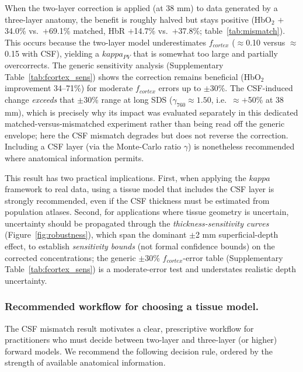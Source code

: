 \documentclass[11pt]{article}
\def\kappa{kappa}%
\def\mathrm#1{#1}%
\def\,{ }%
\begin{document}
When the two-layer correction is applied (at 38\,mm) to data generated by a three-layer anatomy, the benefit is roughly halved but stays positive (HbO$_2$ $+$34.0\% vs.\ $+$69.1\% matched, HbR $+$14.7\% vs.\ $+$37.8\%; table~\ref{tab:mismatch}). This occurs because the two-layer model underestimates $f_{\mathrm{cortex}}$ ($\approx$0.10 versus $\approx$0.15 with CSF), yielding a $\kappa_{\mathrm{PV}}$ that is somewhat too large and partially overcorrects. The generic sensitivity analysis (Supplementary Table~\ref{tab:fcortex_sens}) shows the correction remains beneficial (HbO$_2$ improvement 34--71\%) for moderate $f_{\mathrm{cortex}}$ errors up to $\pm$30\%. The CSF-induced change \emph{exceeds} that $\pm$30\% range at long SDS ($\gamma_{760}\approx1.50$, i.e.\ $\approx+$50\% at 38\,mm), which is precisely why its impact was evaluated separately in this dedicated matched-versus-mismatched experiment rather than being read off the generic envelope; here the CSF mismatch degrades but does not reverse the correction. Including a CSF layer (via the Monte-Carlo ratio $\gamma$) is nonetheless recommended where anatomical information permits.

This result has two practical implications. First, when applying the $\kappa$ framework to real data, using a tissue model that includes the CSF layer is strongly recommended, even if the CSF thickness must be estimated from population atlases. Second, for applications where tissue geometry is uncertain, uncertainty should be propagated through the \emph{thickness-sensitivity curves} (Figure~\ref{fig:robustness}), which span the dominant $\pm$2\,mm superficial-depth effect, to establish \emph{sensitivity bounds} (not formal confidence bounds) on the corrected concentrations; the generic $\pm$30\% $f_{\mathrm{cortex}}$-error table (Supplementary Table~\ref{tab:fcortex_sens}) is a moderate-error test and understates realistic depth uncertainty.

\subsubsection{Recommended workflow for choosing a tissue model.}

The CSF mismatch result motivates a clear, prescriptive workflow for practitioners who must decide between two-layer and three-layer (or higher) forward models. We recommend the following decision rule, ordered by the strength of available anatomical information.
\end{document}

